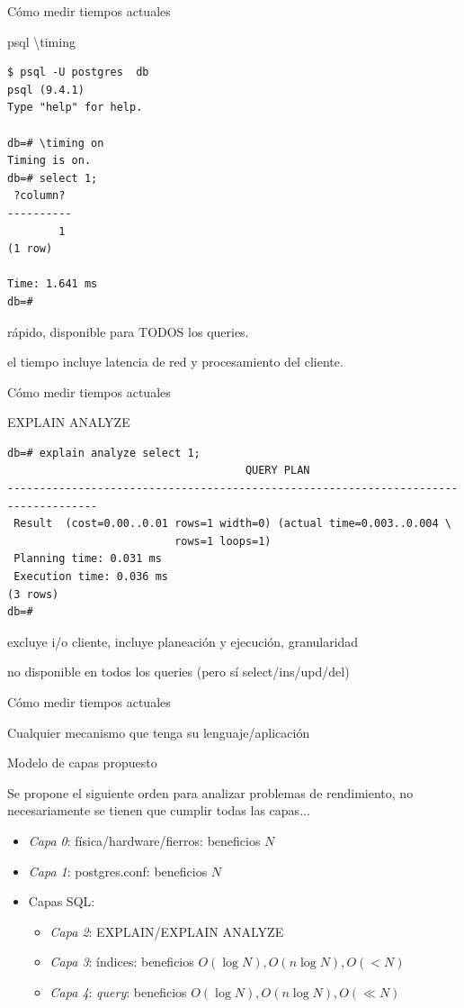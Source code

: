 \documentclass[11pt,spanish]{article}
\newcommand{\rowsp}[1][1em]{\vspace{#1}}
\newcommand{\hone}[1]{{\rowsp[0.3em]\noindent\Large #1 \rowsp[0.3em]}}
\newcommand{\htwo}[1]{{\rowsp\noindent\large #1 \rowsp}}
\newcommand{\myitm}[1]{\begin{itemize}#1\end{itemize}}
\newcommand{\mydesc}[1]{%
	\begin{description}
	\setlength\itemsep{0em}%
	#1
	\end{description}
}
\newcommand{\pros}{\item[pros:]}
\newcommand{\cons}{\item[cons:]}
\begin{document}
\newpage
\hone{Cómo medir tiempos actuales}

\htwo{psql \textbackslash timing}

\begin{multicols}{2}
\begin{lstlisting}
$ psql -U postgres  db      
psql (9.4.1)
Type "help" for help.

db=# \timing on
Timing is on.
db=# select 1;
 ?column? 
----------
        1
(1 row)

Time: 1.641 ms
db=# 
\end{lstlisting}

\columnbreak

\mydesc{
	\pros rápido, disponible para TODOS los queries.
	\cons el tiempo incluye latencia de red y procesamiento del cliente.
}
\end{multicols}

\newpage %
\hone{Cómo medir tiempos actuales}

\htwo{EXPLAIN ANALYZE}

\begin{lstlisting}
db=# explain analyze select 1;
                                     QUERY PLAN                                     
------------------------------------------------------------------------------------
 Result  (cost=0.00..0.01 rows=1 width=0) (actual time=0.003..0.004 \
					   	  rows=1 loops=1)
 Planning time: 0.031 ms
 Execution time: 0.036 ms
(3 rows)
db=# 
\end{lstlisting}

\mydesc{
	\pros excluye i/o cliente, incluye planeación y ejecución, granularidad
	\cons no disponible en todos los queries (pero sí select/ins/upd/del)
}

\newpage %
\hone{Cómo medir tiempos actuales}

\begin{center}
\htwo{Cualquier mecanismo que tenga su lenguaje/aplicación}
\end{center}

\newpage %
\hone{Modelo de capas propuesto}

Se propone el siguiente orden para analizar problemas de rendimiento,
no necesariamente se tienen que cumplir todas las capas...

\myitm{
	\item \emph{Capa 0}: física/hardware/fierros: beneficios $N$
	\item \emph{Capa 1}: postgres.conf: beneficios $N$
	\item Capas SQL:
	\myitm{
		\item \emph{Capa 2}: EXPLAIN/EXPLAIN ANALYZE
		\item \emph{Capa 3}: índices: beneficios 
			$O(\log N), O(n \log N), O(<N)$
		\item \emph{Capa 4}: \emph{query}: beneficios
			$O(\log N), O(n \log N), O(\ll N)$
	}
}
\end{document}
